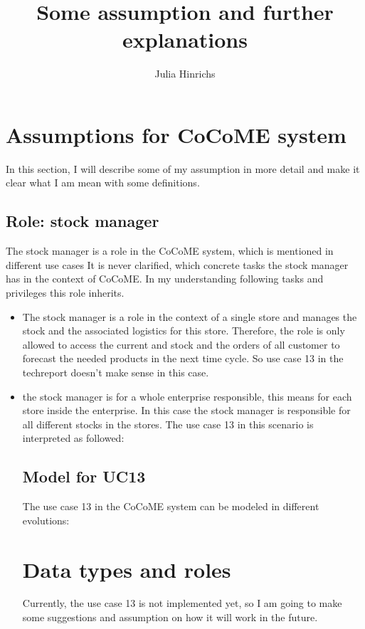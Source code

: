 \documentclass[10pt,a4paper]{article}
\begin{document}
\title{Some assumption and further explanations}
\author{Julia Hinrichs}

\section{Assumptions for CoCoME system}
In this section, I will describe some of my assumption in more detail and make it clear what I am mean with some definitions.
\subsection{Role: stock manager}
The stock manager is a role in the CoCoME system, which is mentioned in different use cases %
It is never clarified, which concrete tasks the stock manager has in the context of CoCoME. In my understanding following tasks and privileges this role inherits.
\begin{itemize}
\item The stock manager is a role in the context of a single store and manages the stock and the associated logistics for this store. Therefore, the role is only allowed to access the current and stock and the orders of all customer to forecast the needed products in the next time cycle. So use case 13 in the techreport doesn't make sense in this case.
\item the stock manager is for a whole enterprise responsible, this means for each store inside the enterprise. In this case the stock manager is responsible for all different stocks in the stores. The use case 13 in this scenario is interpreted as followed:\\

\subsection{Model for UC13}
The use case 13 in the CoCoME system can be modeled in different evolutions:


\section{Data types and roles}
Currently, the use case 13 is not implemented yet, so I am going to make some suggestions and assumption on how it will work in the future.
\end{itemize}
\end{document}

